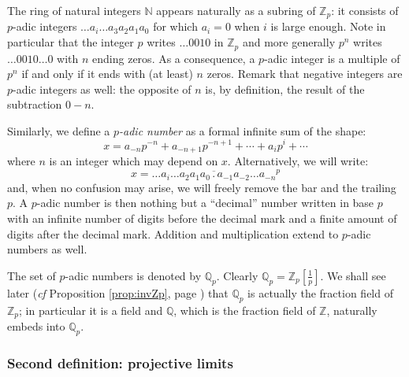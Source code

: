\documentclass[11pt]{article}
\numberwithin{equation}{section}
\numberwithin{figure}{section}
\theoremstyle{definition}
\newcommand{\N}{\mathbb N}
\newcommand{\Z}{\mathbb Z}
\newcommand{\Q}{\mathbb Q}
\begin{document}
%
The ring of natural integers $\N$ appears naturally as a subring of 
$\Z_p$: it consists of $p$-adic integers $\ldots a_i \ldots a_3 a_2 a_1 
a_0$ for which $a_i = 0$ when $i$ is large enough. Note in particular 
that the integer $p$ writes $\ldots 0010$ in $\Z_p$ and more generally 
$p^n$ writes $\ldots 0010\ldots 0$ with $n$ ending zeros.
As a consequence, a $p$-adic integer is a multiple of $p^n$ if and 
only if it ends with (at least) $n$ zeros.
Remark that negative integers are $p$-adic integers as well: the 
opposite of $n$ is, by definition, the result of the subtraction 
$0{-}n$.

\bigskip

Similarly, we define a \emph{$p$-adic number} as a formal infinite sum of 
the shape:
$$x = a_{-n} p^{-n} + a_{-n+1} p^{-n+1} + \cdots + a_i p^i + \cdots$$
where $n$ is an integer which may depend on $x$. 
Alternatively, we will write:
$$x = \overline{\ldots a_i \ldots a_2 a_1 a_0\,.\, 
a_{-1} a_{-2} \ldots a_{-n}}^p$$
and, when no confusion may arise, we will freely remove the bar and the 
trailing $p$.
A $p$-adic number is then nothing but a ``decimal'' number written in 
base $p$ with an infinite number of digits before the decimal mark 
and a
finite amount of digits after the decimal mark. Addition and multiplication
extend to $p$-adic numbers as well.

The set of $p$-adic numbers is denoted by $\Q_p$. Clearly $\Q_p = 
\Z_p[\frac 1 p]$. We shall see later (\emph{cf} Proposition 
\ref{prop:invZp}, page \pageref{prop:invZp}) that $\Q_p$ is actually the 
fraction field of $\Z_p$; in particular it is a field and $\Q$, which is 
the fraction field of $\Z$, naturally embeds into $\Q_p$.

\subsubsection{Second definition: projective limits}
\end{document}
